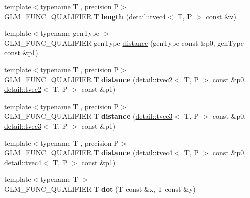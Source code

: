 \begin{DoxyCompactItemize}
\item 
{\footnotesize template$<$typename T , precision P$>$ }\\G\+L\+M\+\_\+\+F\+U\+N\+C\+\_\+\+Q\+U\+A\+L\+I\+F\+I\+ER T {\bfseries length} (\hyperlink{structglm_1_1detail_1_1tvec4}{detail\+::tvec4}$<$ T, P $>$ const \&v)\hypertarget{namespaceglm_a10caf4973f213ff24dd3d103d8756562}{}\label{namespaceglm_a10caf4973f213ff24dd3d103d8756562}

\item 
{\footnotesize template$<$typename gen\+Type $>$ }\\G\+L\+M\+\_\+\+F\+U\+N\+C\+\_\+\+Q\+U\+A\+L\+I\+F\+I\+ER gen\+Type \hyperlink{group__core__func__geometric_ga00716eae37e8ae2a76ca7799f9c75682}{distance} (gen\+Type const \&p0, gen\+Type const \&p1)
\item 
{\footnotesize template$<$typename T , precision P$>$ }\\G\+L\+M\+\_\+\+F\+U\+N\+C\+\_\+\+Q\+U\+A\+L\+I\+F\+I\+ER T {\bfseries distance} (\hyperlink{structglm_1_1detail_1_1tvec2}{detail\+::tvec2}$<$ T, P $>$ const \&p0, \hyperlink{structglm_1_1detail_1_1tvec2}{detail\+::tvec2}$<$ T, P $>$ const \&p1)\hypertarget{namespaceglm_a7ad95124e1674eaaffae23b7988de4ee}{}\label{namespaceglm_a7ad95124e1674eaaffae23b7988de4ee}

\item 
{\footnotesize template$<$typename T , precision P$>$ }\\G\+L\+M\+\_\+\+F\+U\+N\+C\+\_\+\+Q\+U\+A\+L\+I\+F\+I\+ER T {\bfseries distance} (\hyperlink{structglm_1_1detail_1_1tvec3}{detail\+::tvec3}$<$ T, P $>$ const \&p0, \hyperlink{structglm_1_1detail_1_1tvec3}{detail\+::tvec3}$<$ T, P $>$ const \&p1)\hypertarget{namespaceglm_a9e81696018e0d4ec6005f4aa5c159ebb}{}\label{namespaceglm_a9e81696018e0d4ec6005f4aa5c159ebb}

\item 
{\footnotesize template$<$typename T , precision P$>$ }\\G\+L\+M\+\_\+\+F\+U\+N\+C\+\_\+\+Q\+U\+A\+L\+I\+F\+I\+ER T {\bfseries distance} (\hyperlink{structglm_1_1detail_1_1tvec4}{detail\+::tvec4}$<$ T, P $>$ const \&p0, \hyperlink{structglm_1_1detail_1_1tvec4}{detail\+::tvec4}$<$ T, P $>$ const \&p1)\hypertarget{namespaceglm_aa4578d64c86a5af614f700eb8a68a732}{}\label{namespaceglm_aa4578d64c86a5af614f700eb8a68a732}

\item 
{\footnotesize template$<$typename T $>$ }\\G\+L\+M\+\_\+\+F\+U\+N\+C\+\_\+\+Q\+U\+A\+L\+I\+F\+I\+ER T {\bfseries dot} (T const \&x, T const \&y)\hypertarget{namespaceglm_a1998fa8aa0ed2caf8cb050bf8ca594eb}{}\label{namespaceglm_a1998fa8aa0ed2caf8cb050bf8ca594eb}


\end{DoxyCompactItemize}
